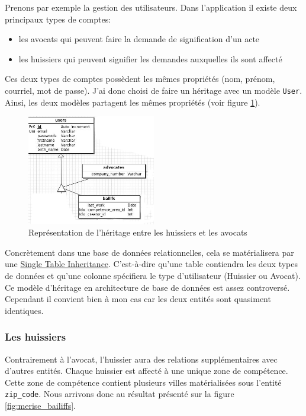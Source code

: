 \documentclass[]{report}
\begin{document}
        Prenons par exemple la gestion des utilisateurs. Dans l'application il existe deux principaux types de comptes:

        \begin{itemize}
          \item les avocats qui peuvent faire la demande de signification d'un acte
          \item les huissiers qui peuvent signifier les demandes auxquelles ils sont affecté
        \end{itemize}

        Ces deux types de comptes possèdent les mêmes propriétés (nom, prénom, courriel, mot de passe). J'ai donc choisi de faire un héritage avec un modèle \verb|User|. Ainsi, les deux modèles partagent les mêmes propriétés (voir figure \ref{fig:merise_users}).

        \begin{figure}[h!]
          \centering
          \includegraphics[width=0.5\textwidth]{img/merise_users.png}
          \caption{Représentation de l'héritage entre les huissiers et les avocats}
          \label{fig:merise_users}
        \end{figure}

        Concrètement dans une base de données relationnelles, cela se matérialisera par une \href{https://en.wikipedia.org/wiki/Single_Table_Inheritance}{Single Table Inheritance}. C'est-à-dire qu'une table contiendra les deux types de données et qu'une colonne spécifiera le type d'utilisateur (Huissier ou Avocat). Ce modèle d'héritage en architecture de base de données est assez controversé. Cependant il convient bien à mon cas car les deux entités sont quasiment identiques.

      \subsubsection{Les huissiers}

        Contrairement à l'avocat, l'huissier aura des relations supplémentaires avec d'autres entités. Chaque huissier est affecté à une unique zone de compétence. Cette zone de compétence contient plusieurs villes matérialisées sous l'entité \verb|zip_code|. Nous arrivons donc au résultat présenté sur la figure \ref{fig:merise_bailiffs}.
\end{document}

